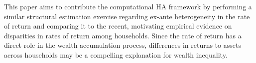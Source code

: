 \documentclass[\econtexRoot/Chp1proposal]{subfiles}
\begin{document}
\par This paper aims to contribute the computational HA framework by performing a similar structural estimation exercise regarding ex-ante heterogeneity in the rate of return and comparing it to the recent, motivating empirical evidence on disparities in rates of return among households. Since the rate of return has a direct role in the wealth accumulation process, differences in returns to assets across households may be a compelling explanation for wealth inequality.



\onlyinsubfile{}

\end{document}

